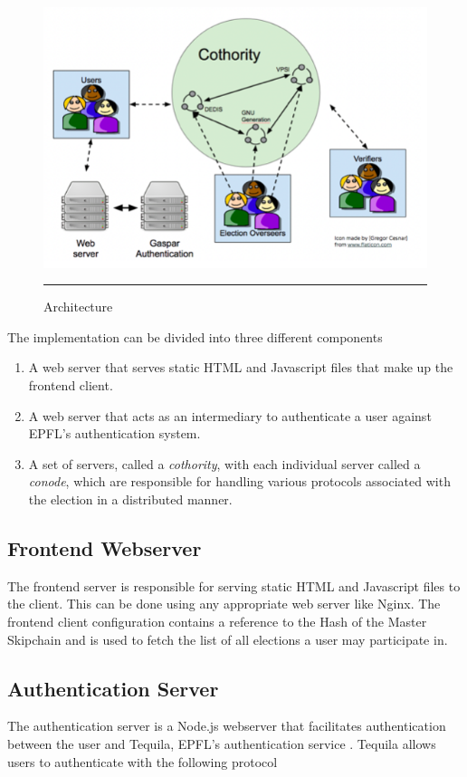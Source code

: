 \begin{figure}[ht]
  \centering
    \includegraphics[scale=0.6]{Figures/Architecture.png}
    \rule{35em}{0.5pt}
  \caption[Architecture]{Architecture}
  \label{fig:Architecture}
\end{figure}

The implementation can be divided into three different components

\begin{enumerate}
  \item A web server that serves static HTML and Javascript files that make up the frontend client.
  \item A web server that acts as an intermediary to authenticate a user against EPFL’s authentication system.
  \item A set of servers, called a \textit{cothority}, with each individual server called a \textit{conode}, which are responsible for handling various protocols associated with the election in a distributed manner.
\end{enumerate}

\subsection{Frontend Webserver}
The frontend server is responsible for serving static HTML and Javascript files to the client. This can be done using any appropriate web server like Nginx. The frontend client configuration contains a reference to the Hash of the Master Skipchain and is used to fetch the list of all elections a user may participate in.

\subsection{Authentication Server}
\label{sec:auth}
The authentication server is a Node.js webserver that facilitates authentication between the user and Tequila, EPFL’s authentication service \cite{tequila}. Tequila allows users to authenticate with the following protocol

